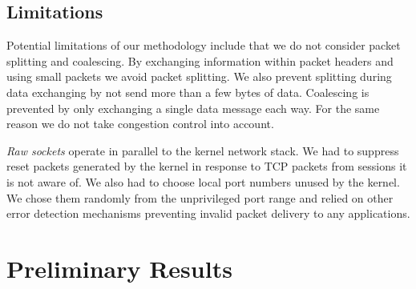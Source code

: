 \documentclass{sig-alternate-10pt}
\begin{document}

\subsection{Limitations}

Potential limitations of our methodology include that we do not consider packet splitting and coalescing. By exchanging information within packet headers and using small packets we avoid packet splitting. We also prevent splitting during data exchanging by not send more than a few bytes of data. Coalescing is prevented by only exchanging a single data message each way. For the same reason we do not take congestion control into account.

\emph{Raw sockets} operate in parallel to the kernel network stack. We had to suppress reset packets generated by the kernel in response to TCP packets from sessions it is not aware of. We also had to choose local port numbers unused by the kernel. We chose them randomly from the unprivileged port range and relied on other error detection mechanisms preventing invalid packet delivery to any applications.

\section{Preliminary Results}
\label{sec:network}
\end{document}
